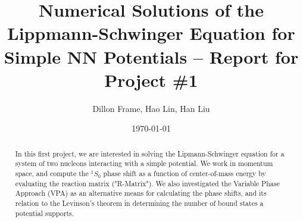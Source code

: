 \documentclass{article}
\begin{document}
\title{Numerical Solutions of the Lippmann-Schwinger Equation for Simple NN Potentials -- Report for Project \#1}
\author{Dillon Frame, Hao Lin, Han Liu}
\date{\today}

\maketitle

\begin{abstract}
In this first project, we are interested in solving the Lipmann-Schwinger equation for a system of two nucleons interacting with a simple potential. We work in momentum space, and compute the $^1S_0$ phase shift as a function of center-of-mass energy by evaluating the reaction matrix ("R-Matrix"). We also investigated the Variable Phase Approach (VPA) as an alternative means for calculating the phase shifts, and its relation to the Levinson's theorem in determining the number of bound states a potential supports.
\end{abstract}
\end{document}
